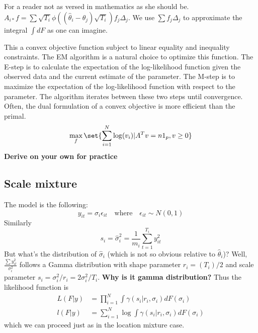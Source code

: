 \begin{remark}
    For a reader not as versed in mathematics as she should be. $A_{i*}f = \sum \sqrt{T_i}\phi((\hat{\theta}_i-\theta_j)\sqrt{T_i})f_j\Delta_j$.
    We use $\sum f_j\Delta_j$ to approximate the integral $\int dF$ as one can imagine.
\end{remark}
This a convex objective function subject to linear equality  and inequality constraints. The EM algorithm is a natural choice to optimize this function. The E-step is to calculate the expectation of the log-likelihood function given the observed data and the current estimate of the parameter. The M-step is to maximize the expectation of the log-likelihood function with respect to the parameter. The algorithm iterates between these two steps until convergence.
Often, the dual formulation of a convex objective is more efficient than the primal.
\begin{equation*}
    \max_f \set{ \sum_{i=1}^N\log (v_i)|A^T v = n 1_p, v\ge 0}
\end{equation*}
\textbf{Derive on your own for practice}

\subsection{Scale mixture}
The model is the following:
\begin{equation*}
    y_{it}=\sigma_i\epsilon_{it} \quad \text{where} \quad \epsilon_{it}\sim N(0,1)
\end{equation*}
Similarly \begin{equation*}
    s_i=\hat{\sigma}_i^2=\frac{1}{m_i}\sum_{t=1}^{T_i}y_{it}^2
\end{equation*}
But what's the distribution of $\hat{\sigma}_i$ (which is not so obvious relative to $\hat{\theta}_i$)?
Well, $\frac{\sum y_{it}^2}{\sigma_i^2}$ follows a Gamma distribution with shape parameter $r_i=(T_i)/2$ and scale parameter $s_i=\sigma_i^2/r_i=2\sigma_i^2/T_i$.
\textbf{Why is it gamma distribution?}
Thus the likelihood function is \begin{align*}
    L(F|y) & =\prod_{i=1}^N\int \gamma(s_i|r_i,\sigma_i)dF(\sigma_i)    \\
    l(F|y) & =\sum_{i=1}^N\log\int \gamma(s_i|r_i,\sigma_i)dF(\sigma_i)
\end{align*}
which we can proceed just as in the location mixture case.
